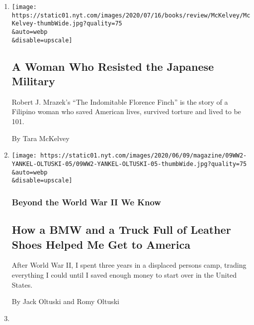 \begin{enumerate}
\def\labelenumi{\arabic{enumi}.}
\item
  \href{/2020/07/22/books/review/the-indomitable-florence-finch-robert-j-mrazek.html}{}

  \texttt{[image: https://static01.nyt.com/images/2020/07/16/books/review/McKelvey/McKelvey-thumbWide.jpg?quality=75\\\&auto=webp\\\&disable=upscale]}

  \hypertarget{a-woman-who-resisted-the-japanese-military}{%
  \subsection{A Woman Who Resisted the Japanese
  Military}\label{a-woman-who-resisted-the-japanese-military}}

  Robert J. Mrazek's ``The Indomitable Florence Finch'' is the story of
  a Filipino woman who saved American lives, survived torture and lived
  to be 101.

  By Tara McKelvey
\item
  \href{/2020/06/09/magazine/how-a-bmw-and-a-truck-full-of-leather-shoes-helped-me-get-to-america.html}{}

  \texttt{[image: https://static01.nyt.com/images/2020/06/09/magazine/09WW2-YANKEL-OLTUSKI-05/09WW2-YANKEL-OLTUSKI-05-thumbWide.jpg?quality=75\\\&auto=webp\\\&disable=upscale]}

  \hypertarget{beyond-the-world-war-ii-we-know-7}{%
  \subsubsection{Beyond the World War II We
  Know}\label{beyond-the-world-war-ii-we-know-7}}

  \hypertarget{how-a-bmw-and-a-truck-full-of-leather-shoes-helped-me-get-to-america}{%
  \subsection{How a BMW and a Truck Full of Leather Shoes Helped Me Get
  to
  America}\label{how-a-bmw-and-a-truck-full-of-leather-shoes-helped-me-get-to-america}}

  After World War II, I spent three years in a displaced persons camp,
  trading everything I could until I saved enough money to start over in
  the United States.

  By Jack Oltuski and Romy Oltuski
\item
  \href{/2020/05/27/magazine/world-war-ii-mexican-air-force.html}{}


\end{enumerate}
